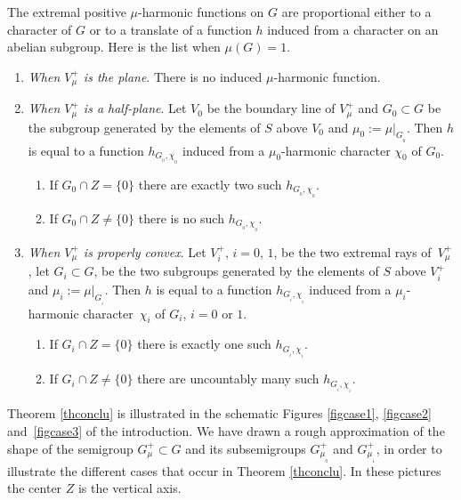 \begin{Thm}
\label{thconclu}
The extremal positive $\mu$-harmonic functions on $G$ are
proportional either to a character
of $G$ or to a translate of a function $h$ induced from a character on an abelian subgroup.
Here is the list when $\mu(G)\!=\!1$.

\begin{enumerate}
\item\label{thconclu1}
\emph{When $V^+_\mu$ is the plane}. There is no induced $\mu$-harmonic function.

\item\label{thconclu2}
\emph{When $V^+_\mu$ is a half-plane}. Let $V_0$ be the boundary line of $V^+_\mu$
and $G_0\subset G$ be the subgroup
generated by the
elements of $S$ above $V_0$ and $\mu_0:=\mu|_{G_{_0}}$.
Then $h$ is equal to a function $h_{G_{_0},\chi_{_0}}$ induced from a $\mu_0$-harmonic character $\chi_0$ of $G_0$.
\begin{enumerate}
\item\label{thconclu2a}
If $G_0\cap Z = \{ 0\}$
there are exactly two such $h_{G_{_0},\chi_{_0}}$.

\item\label{thconclu2b}
If $G_0\cap Z\neq \{ 0\}$ there is no such $h_{G_{_0},\chi_{_0}}$.
\end{enumerate}

\item\label{thconclu3}
\emph{When $V^+_\mu$ is properly convex}. Let $V^+_i$, $i=0$, $1$, be the two
extremal rays of~$V^+_\mu$, let $G_i\subset G$,
be the two subgroups generated by the
elements of $S$ above $V^+_i$ and $\mu_i:=\mu|_{G_{_i}}$.
Then $h$ is equal to a function $h_{G_{_i},\chi_{_i}}$ induced from a $\mu_i$-harmonic character~$\chi_i$ of $G_i$, $i=0$ or $1$.
\begin{enumerate}
\item\label{thconclu3a}
If $G_i\cap Z = \{ 0\}$
there is exactly one such $h_{G_{_i},\chi_{_i}}$.

\item\label{thconclu3b}
If $G_i\cap Z\neq \{ 0\}$
there are uncountably many such $h_{G_{_i},\chi_{_i}}$.
\end{enumerate}
\end{enumerate}
\end{Thm}

\begin{Rem}
Theorem \ref{thconclu} is illustrated in the schematic Figures \ref{figcase1}, \ref{figcase2} and~\ref{figcase3} of the introduction. We have drawn a rough approximation
of the shape of the semigroup $G^+_\mu\subset G$
and its subsemigroups $G^+_{\mu_{_0}}$ and $G^+_{\mu_{_1}}$,
in order to illustrate the different cases that occur in Theorem \ref{thconclu}.
In these pictures the center $Z$ is the vertical axis.
\end{Rem}


